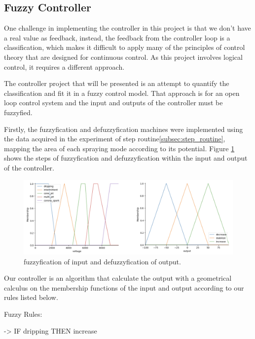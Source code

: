 \subsection{Fuzzy Controller}

        One challenge in implementing the controller in this project is that we don't have a real value as feedback, instead, the feedback from the controller loop is a classification, which makes it difficult to apply many of the principles of control theory that are designed for continuous control. 
        As this project involves logical control, it requires a different approach. 
        
        The controller project that will be presented is an attempt to quantify the classification and fit it in a fuzzy control model.
        That approach is for an open loop control system and the input and outputs of the controller must be fuzzyfied.

        Firstly, the fuzzyfication and defuzzyfication machines were implemented using the data acquired in the experiment of step routine\ref{subsec:step_routine}, mapping the area of each spraying mode according to its potential.
        Figure \ref{fig:fuzzyy} shows the steps of fuzzyfication and defuzzyfication within the input and output of the controller.


            \begin{figure}[H]
                \centering
                \includegraphics[width=17cm]{Figuras/fuzzy/Fuzzyy.png}
                \caption{fuzzyfication of input and defuzzyfication of output.}
                \label{fig:fuzzyy}
            \end{figure}



        Our controller is an algorithm that calculate the output with a geometrical calculus on the membership functions of the input and output according to our rules listed below.

        Fuzzy Rules:

        -> IF dripping THEN increase

